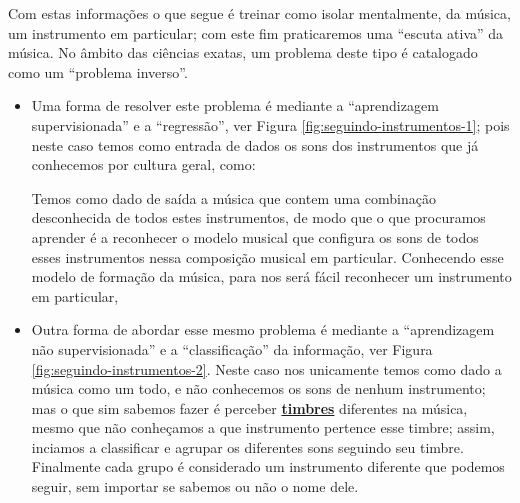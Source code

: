 Com estas informações o que segue é treinar como isolar mentalmente, da música, 
um instrumento em particular;
com este fim praticaremos uma ``escuta ativa'' da música. 
No âmbito das ciências exatas, um problema deste tipo é catalogado como um ``problema inverso''.
\begin{itemize}
\item Uma forma de resolver este problema é mediante a ``aprendizagem supervisionada'' 
e  a ``regressão'', ver Figura \ref{fig:seguindo-instrumentos-1};
pois neste caso temos como entrada de dados os sons dos instrumentos que já conhecemos por cultura geral,
como: 
Temos como dado de saída a música que contem uma combinação desconhecida de todos estes instrumentos,
de modo que o que procuramos aprender é a reconhecer o modelo musical 
que configura os sons de todos esses instrumentos
nessa composição musical em particular.
Conhecendo esse modelo de formação da música, 
para nos será fácil reconhecer um instrumento em particular,

\item Outra forma de abordar esse mesmo problema é mediante a ``aprendizagem não supervisionada'' 
e  a ``classificação'' da informação, ver Figura \ref{fig:seguindo-instrumentos-2}.
Neste caso nos unicamente temos como dado a música como um todo,
e não conhecemos os sons de nenhum instrumento;
mas o que sim sabemos fazer é perceber 
\hyperref[sec:pos:timbre]{\textbf{timbres}} diferentes na música,
mesmo que não conheçamos a que instrumento pertence esse timbre;
assim, inciamos a classificar e agrupar os diferentes sons seguindo seu timbre.
Finalmente cada grupo é considerado um instrumento diferente que podemos seguir,
sem importar se sabemos ou não o nome dele.
\end{itemize}
